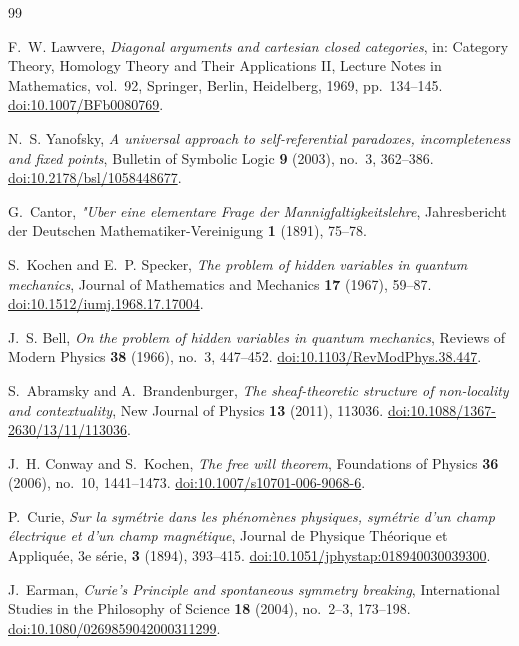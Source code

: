 \documentclass[11pt]{article}
\theoremstyle{definition}
\theoremstyle{remark}
\begin{document}
\begin{thebibliography}{99}

F.~W. Lawvere,
\emph{Diagonal arguments and cartesian closed categories},
in: Category Theory, Homology Theory and Their Applications II,
Lecture Notes in Mathematics, vol.~92, Springer, Berlin, Heidelberg, 1969, pp.~134--145.
\href{https://doi.org/10.1007/BFb0080769}{doi:10.1007/BFb0080769}.

N.~S. Yanofsky,
\emph{A universal approach to self-referential paradoxes, incompleteness and fixed points},
Bulletin of Symbolic Logic \textbf{9} (2003), no.~3, 362--386.
\href{https://doi.org/10.2178/bsl/1058448677}{doi:10.2178/bsl/1058448677}.

G.~Cantor,
\emph{"Uber eine elementare Frage der Mannigfaltigkeitslehre},
Jahresbericht der Deutschen Mathematiker-Vereinigung \textbf{1} (1891), 75--78.

S.~Kochen and E.~P. Specker,
\emph{The problem of hidden variables in quantum mechanics},
Journal of Mathematics and Mechanics \textbf{17} (1967), 59--87.
\href{https://doi.org/10.1512/iumj.1968.17.17004}{doi:10.1512/iumj.1968.17.17004}.

J.~S. Bell,
\emph{On the problem of hidden variables in quantum mechanics},
Reviews of Modern Physics \textbf{38} (1966), no.~3, 447--452.
\href{https://doi.org/10.1103/RevModPhys.38.447}{doi:10.1103/RevModPhys.38.447}.

S.~Abramsky and A.~Brandenburger,
\emph{The sheaf-theoretic structure of non-locality and contextuality},
New Journal of Physics \textbf{13} (2011), 113036.
\href{https://doi.org/10.1088/1367-2630/13/11/113036}{doi:10.1088/1367-2630/13/11/113036}.

J.~H. Conway and S.~Kochen,
\emph{The free will theorem},
Foundations of Physics \textbf{36} (2006), no.~10, 1441--1473.
\href{https://doi.org/10.1007/s10701-006-9068-6}{doi:10.1007/s10701-006-9068-6}.

P.~Curie,
\emph{Sur la sym\'etrie dans les ph\'enom\`enes physiques, sym\'etrie d'un champ \'electrique et d'un champ magn\'etique},
Journal de Physique Th\'eorique et Appliqu\'ee, 3e s\'erie, \textbf{3} (1894), 393--415.
\href{https://doi.org/10.1051/jphystap:018940030039300}{doi:10.1051/jphystap:018940030039300}.

J.~Earman,
\emph{Curie's Principle and spontaneous symmetry breaking},
International Studies in the Philosophy of Science \textbf{18} (2004), no.~2--3, 173--198.
\href{https://doi.org/10.1080/0269859042000311299}{doi:10.1080/0269859042000311299}.


\end{thebibliography}
\end{document}
